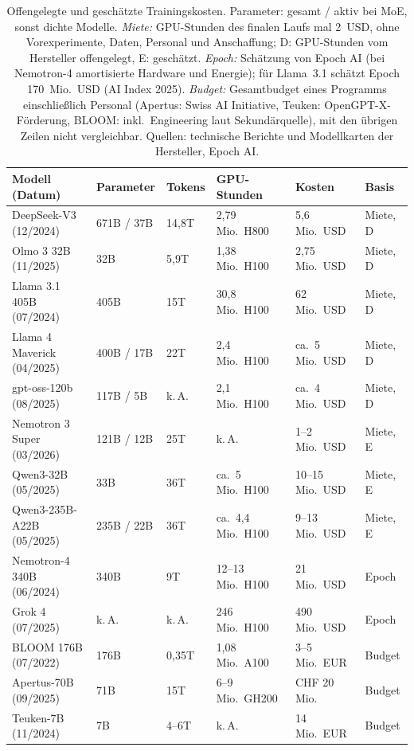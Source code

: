 \documentclass[a4paper,11pt]{article}
\begin{document}
\begin{table}[htbp]
  \centering
  \footnotesize
  \setlength{\tabcolsep}{3pt}
  \begin{tabular}{llllll}
    \toprule
    Modell (Datum) & Parameter & Tokens & GPU-Stunden & Kosten & Basis \\
    \midrule
    DeepSeek-V3 (12/2024) & 671B / 37B & 14,8T & 2,79 Mio.\ H800 & 5,6 Mio.\ USD & Miete, D \\
    Olmo 3 32B (11/2025) & 32B & 5,9T & 1,38 Mio.\ H100 & 2,75 Mio.\ USD & Miete, D \\
    Llama 3.1 405B (07/2024) & 405B & 15T & 30,8 Mio.\ H100 & 62 Mio.\ USD & Miete, D \\
    Llama 4 Maverick (04/2025) & 400B / 17B & 22T & 2,4 Mio.\ H100 & ca.\ 5 Mio.\ USD & Miete, D \\
    gpt-oss-120b (08/2025) & 117B / 5B & k.\,A. & 2,1 Mio.\ H100 & ca.\ 4 Mio.\ USD & Miete, D \\
    Nemotron 3 Super (03/2026) & 121B / 12B & 25T & k.\,A. & 1--2 Mio.\ USD & Miete, E \\
    Qwen3-32B (05/2025) & 33B & 36T & ca.\ 5 Mio.\ H100 & 10--15 Mio.\ USD & Miete, E \\
    Qwen3-235B-A22B (05/2025) & 235B / 22B & 36T & ca.\ 4,4 Mio.\ H100 & 9--13 Mio.\ USD & Miete, E \\
    \midrule
    Nemotron-4 340B (06/2024) & 340B & 9T & 12--13 Mio.\ H100 & 21 Mio.\ USD & Epoch \\
    Grok 4 (07/2025) & k.\,A. & k.\,A. & 246 Mio.\ H100 & 490 Mio.\ USD & Epoch \\
    \midrule
    BLOOM 176B (07/2022) & 176B & 0,35T & 1,08 Mio.\ A100 & 3--5 Mio.\ EUR & Budget \\
    Apertus-70B (09/2025) & 71B & 15T & 6--9 Mio.\ GH200 & CHF 20 Mio. & Budget \\
    Teuken-7B (11/2024) & 7B & 4--6T & k.\,A. & 14 Mio.\ EUR & Budget \\
    \bottomrule
  \end{tabular}
  \caption{Offengelegte und geschätzte Trainingskosten. Parameter:
    gesamt / aktiv bei MoE, sonst dichte Modelle. \emph{Miete:}
    GPU-Stunden des finalen Laufs mal 2~USD, ohne Vorexperimente,
    Daten, Personal und Anschaffung; D: GPU-Stunden vom Hersteller
    offengelegt, E: geschätzt. \emph{Epoch:} Schätzung von Epoch AI
    (bei Nemotron-4 amortisierte Hardware und Energie); für Llama~3.1
    schätzt Epoch 170~Mio.\ USD (AI Index 2025). \emph{Budget:}
    Gesamtbudget eines Programms einschließlich Personal (Apertus:
    Swiss AI Initiative, Teuken: OpenGPT-X-Förderung, BLOOM: inkl.\
    Engineering laut Sekundärquelle), mit den übrigen Zeilen nicht
    vergleichbar. Quellen: technische Berichte und Modellkarten der
    Hersteller, Epoch AI.}
  \label{tab:kosten}
\end{table}
\end{document}
